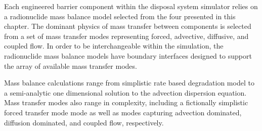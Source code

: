 Each engineered barrier component within the \Cyder disposal system simulator 
relies on a radionuclide mass balance model selected from the four presented in 
this chapter.  The dominant physics of mass transfer between components is 
selected from a set of mass transfer modes representing forced, advective, 
diffusive, and coupled flow.  In order to be interchangeable within the 
simulation, the radionuclide mass balance models have boundary interfaces 
designed to support the array of available mass transfer modes. 

Mass balance calculations range from simplistic rate based degradation model to 
a semi-analytic one dimensional solution to the advection dispersion equation.  
Mass transfer modes also range in complexity, including a fictionally 
simplistic forced transfer mode mode as well as modes capturing advection 
dominated, diffusion dominated, and coupled flow, respectively.
